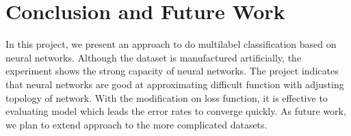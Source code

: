 \section{Conclusion and Future Work}

In this project, we present an approach to do multilabel classification based on neural networks. Although the dataset is manufactured artificially, the experiment shows the strong capacity of neural networks. The project indicates that neural networks are good at approximating difficult function with adjusting topology of network. With the modification on loss function, it is effective to evaluating model which leads the error rates to converge quickly. As future work, we plan to extend approach to the more complicated datasets.